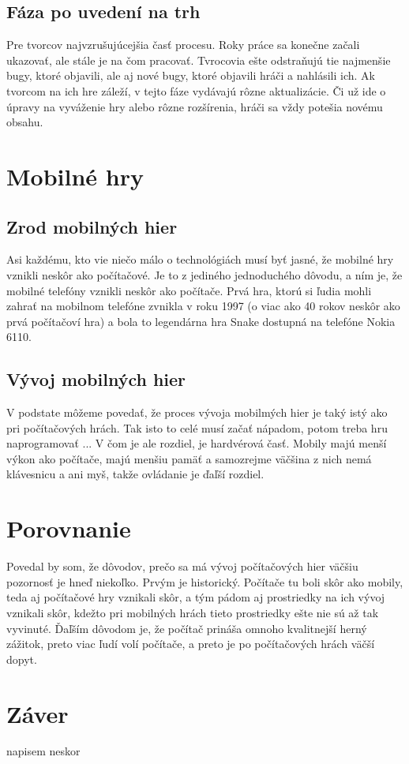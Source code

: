\documentclass[10pt,twoside,slovak,a4paper]{article}
\begin{document}
\subsection{Fáza po uvedení na trh}
Pre tvorcov najvzrušujúcejšia časť procesu. Roky práce sa konečne začali ukazovať, ale stále je na čom pracovať. Tvrocovia ešte odstraňujú tie najmenšie bugy, ktoré objavili, ale aj nové bugy, ktoré objavili hráči a nahlásili ich. Ak tvorcom na ich hre záleží, v tejto fáze vydávajú rôzne aktualizácie. Či už ide o úpravy na vyváženie hry alebo rôzne rozšírenia, hráči sa vždy potešia novému obsahu.~\cite{1}


\section{Mobilné hry} \label{mobilne}

\subsection{Zrod mobilných hier}

Asi každému, kto vie niečo málo o technológiách musí byť jasné, že mobilné hry vznikli neskôr ako počítačové. Je to z jediného jednoduchého dôvodu, a ním je, že mobilné telefóny vznikli neskôr ako počítače. Prvá hra, ktorú si ľudia mohli zahrať na mobilnom telefóne zvnikla v roku 1997 (o viac ako 40 rokov neskôr ako prvá počítačoví hra) a bola to legendárna hra Snake dostupná na telefóne Nokia 6110.~\cite{2}

\subsection{Vývoj mobilných hier}
V podstate môžeme povedať, že proces vývoja mobilmých hier je taký istý ako pri počítačových hrách. Tak isto to celé musí začať nápadom, potom treba hru naprogramovať ... V čom je ale rozdiel, je hardvérová časť. Mobily majú menší výkon ako počítače, majú menšiu pamäť a samozrejme väčšina z nich nemá klávesnicu a ani myš, takže ovládanie je ďaľší rozdiel.

\section{Porovnanie} \label{porovnanie}

Povedal by som, že dôvodov, prečo sa má vývoj počítačových hier väčšiu pozornosť je hneď niekoľko. Prvým je historický. Počítače tu boli skôr ako mobily, teda aj počítačové hry vznikali skôr, a tým pádom aj prostriedky na ich vývoj vznikali skôr, kdežto pri mobilných hrách tieto prostriedky ešte nie sú až tak vyvinuté. Ďaľším dôvodom je, že počítač prináša omnoho kvalitnejší herný zážitok, preto viac ľudí volí počítače, a preto je po počítačových hrách väčší dopyt.

\section{Záver} \label{zaver}
napisem neskor


\end{document}
